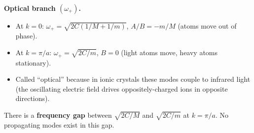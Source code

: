 \documentclass[11pt,a4paper]{article}
\begin{document}
\textbf{Optical branch $(\omega_+)$.}
\begin{itemize}
\item At $k=0$: $\omega_+=\sqrt{2C(1/M+1/m)}$, $A/B=-m/M$ (atoms move out of phase).
\item At $k=\pi/a$: $\omega_+=\sqrt{2C/m}$, $B=0$ (light atoms move, heavy atoms stationary).
\item Called ``optical'' because in ionic crystals these modes couple to infrared light
(the oscillating electric field drives oppositely-charged ions in opposite directions).
\end{itemize}

\begin{keybox}
There is a \textbf{frequency gap} between $\sqrt{2C/M}$ and $\sqrt{2C/m}$ at
$k=\pi/a$. No propagating modes exist in this gap.
\end{keybox}
\end{document}
